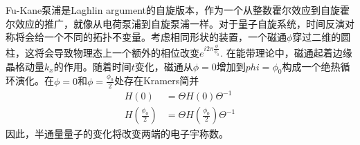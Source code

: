 \documentclass{article}
\numberwithin{equation}{subsection}
\begin{document}
Fu-Kane泵浦是Laghlin argument的自旋版本，作为一个从整数霍尔效应到自旋霍尔效应的推广，就像从电荷泵浦到自旋泵浦一样。对于量子自旋系统，时间反演对称将会给一个不同的拓扑不变量。考虑相同形状的装置，一个磁通$\phi$穿过二维的圆柱，这将会导致物理态上一个额外的相位改变$e^{i2\pi\frac{\phi}{\phi_0}}$. 在能带理论中，磁通起着边缘晶格动量$k_x$的作用。随着时间$t$变化，磁通从$\phi=0$增加到$phi=\phi_0$构成一个绝热循环演化。在$\phi=0$和$\phi=\frac{\phi_0}{2}$处存在Kramers简并
\begin{equation}
    \begin{split}
        H(0)&=\Theta H(0)\Theta^{-1}\\
        H(\frac{\phi_0}{2})&=\Theta H(\frac{\phi_0}{2})\Theta^{-1}
    \end{split}
\end{equation}
因此，半通量量子的变化将改变两端的电子宇称数。
\end{document}
